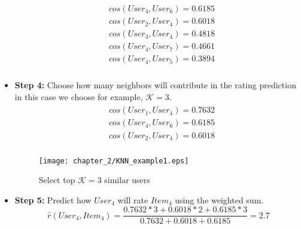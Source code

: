 \begin{itemize}
\begin{align*}
\begin{split}
			&cos(User_4, User_6) = 0.6185\\
			&cos(User_2, User_4) = 0.6018\\
			&cos(User_3, User_4) = 0.4818\\
			&cos(User_4, User_7) = 0.4661\\
			&cos(User_4, User_5) = 0.3894\\
		\end{split}
	\end{align*}
	\item[] \textbf{Step 4:}  Choose how many neighbors will contribute in the rating
	prediction in this case we choose for example, $\mathcal{K}=3$.
	\begin{align*}
		\begin{split}
			&cos(User_1, User_4) = 0.7632\\
			&cos(User_4, User_6) = 0.6185\\
			&cos(User_2, User_4) = 0.6018\\
		\end{split}
	\end{align*}
	\begin{figure}[H]
	\centering
	\texttt{[image: chapter\_2/KNN\_example1.eps]}
	\caption{Select top $\mathcal{K}=3$ similar users}
	\label{figure:neighbor_selection}
	\end{figure}
	\item[] \textbf{Step 5:} Predict how $User_4$ will rate $Item_4$ using the weighted sum.
	$$\hat{r}(User_4,Item_4) = \frac{0.7632*3 + 0.6018*2 + 0.6185*3}{0.7632 + 0.6018 + 0.6185} = 2.7$$
\end{itemize}
